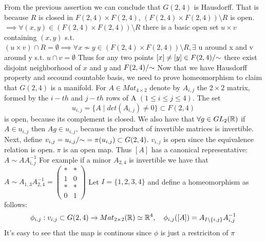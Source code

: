 \documentclass[11pt,a4paper]{report}
\begin{document}
From the previous assertion we can conclude that $G(2,4)$ is Hausdorff. 
\newline
That is because $R$ is closed in $F(2,4) \times F(2,4)$, $(F(2,4) \times F(2,4)) \setminus R$ is open.
$\implies \forall (x,y) \in (F(2,4) \times F(2,4)) \setminus R $ there is a basic open set $u \times v$ containing $(x,y)$ s.t. $ (u \times v) \cap R = \emptyset 
\implies \forall x \nsim y \in (F(2,4) \times F(2,4)) \setminus R , \exists$ u around x and v around y s.t. $u \cap v = \emptyset$
Thus for any two points $[x] \neq [y] \in F(2,4)/{\sim}$ there exist disjoint neighborhood of $x$ and $y$ and $ F(2,4)/{\sim} $
\newline
\newline
Now that we have Hausdorff property and secound countable basis, we need to prove homeomorphism to claim that $G(2,4)$ is a manifold.
\newline
For $A \in Mat_{4 \times 2} $ denote by $A_{i,j}$ the $2 \times 2$ matrix, formed by the $i-th$ and $j-th$ rows of A $(1 \leq i \le j \leq 4)$. The set
$$ u_{i,j} = \{ A \; | \; det(A_{i,j}) \neq 0 \} \subset F(2,4)$$ is open, because its complement is closed. 
We also have that $\forall g \in GL_2(\mathbb{R})$ if $A \in u_{i,j}$ then $ Ag \in u_{i,j}$, because the product of invertible matrices is invertible.
Next, define $v_{i,j} = u_{i,j}/{\sim} = \pi (u_{i,j}) \subset G(2,4)$.
$v_{i,j}$ is open since the equivalence relation is open.$\; \pi$ is an open map.
Thus $[A]$ has a canonical representative: $A \sim A A_{i,j}^{-1} $
For example if a minor $A_{2,4}$ is invertible we have that
$
A \sim A_{1,3} A_{2,4}^{-1} = 
\begin{pmatrix}
* & * \\
1 & 0 \\
* & * \\
0 & 1
\end{pmatrix}
$
Let $I = \{ 1,2,3,4 \}$ and  define a homeomorphism as follows:
$$ \phi_{i,j}: v_{i,j} \subset G(2,4) \to Mat_{2 \times 2} (\mathbb{R}) \simeq \mathbb{R}^4, \quad \phi_{i,j}([A]) = A_{I \setminus \{ i,j \} }A_{i,j}^{-1} $$
It's easy to see that the map is continous since $\phi$ is just a restriciton of $\pi$
\newline
\end{document}
